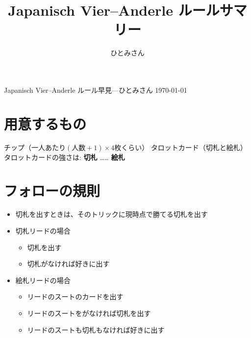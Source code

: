\documentclass[line_length=50zw,head_space=2cm,foot_space=1cm]{jlreq}
\begin{document}
\pagestyle{empty}

\vspace{-1cm}
\title{Japanisch Vier--Anderle ルールサマリー}
\author{ひとみさん}

\begin{center}
{\LARGE Japanisch Vier--Anderle ルール早見}---ひとみさん \today
\end{center}

\setlength{\parindent}{0pt}

\section{用意するもの}
\textbullet チップ（一人あたり\((\text{人数}+\text{1})\times\text{4}\)枚くらい）\quad
\textbullet タロットカード（切札と絵札）\\
タロットカードの強さは:
\textbf{切札}   
……  
\textbf{絵札}   

\section{フォローの規則}
\begin{itemize}
	\item 切札を出すときは、そのトリックに現時点で勝てる切札を出す
	\item 切札リードの場合
		\begin{itemize}
			\item 切札を出す
			\item 切札がなければ好きに出す
		\end{itemize}
	\item 絵札リードの場合
		\begin{itemize}
			\item リードのスートのカードを出す
			\item リードのスートをがなければ切札を出す
			\item リードのスートも切札もなければ好きに出す
		\end{itemize}
\end{itemize}
\end{document}
